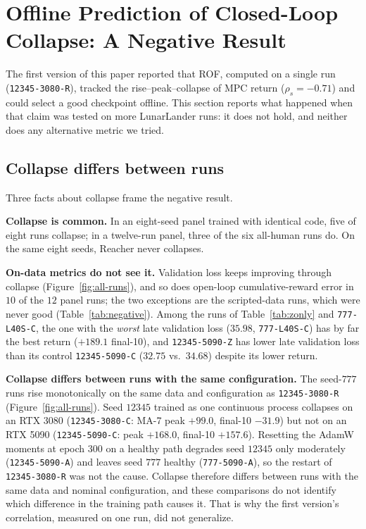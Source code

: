 \documentclass[11pt]{article}
\theoremstyle{remark}
\begin{document}
\section{Offline Prediction of Closed-Loop Collapse: A Negative Result}
\label{sec:negative}

The first version of this paper reported that ROF, computed on a single run (\texttt{12345-3080-R}), tracked the rise--peak--collapse of MPC return ($\rho_s{=}-0.71$) and could select a good checkpoint offline. This section reports what happened when that claim was tested on more LunarLander runs: it does not hold, and neither does any alternative metric we tried.

\subsection{Collapse differs between runs}
\label{sec:heterogeneity}

Three facts about collapse frame the negative result.

\textbf{Collapse is common.} In an eight-seed panel trained with identical code, five of eight runs collapse; in a twelve-run panel, three of the six all-human runs do. On the same eight seeds, Reacher never collapses.

\textbf{On-data metrics do not see it.} Validation loss keeps improving through collapse (Figure~\ref{fig:all-runs}), and so does open-loop cumulative-reward error in $10$ of the $12$ panel runs; the two exceptions are the scripted-data runs, which were never good (Table~\ref{tab:negative}). Among the runs of Table~\ref{tab:zonly} and \texttt{777-L40S-C}, the one with the \emph{worst} late validation loss ($35.98$, \texttt{777-L40S-C}) has by far the best return ($+189.1$ final-10), and \texttt{12345-5090-Z} has lower late validation loss than its control \texttt{12345-5090-C} ($32.75$ vs.\ $34.68$) despite its lower return.

\textbf{Collapse differs between runs with the same configuration.} The seed-$777$ runs rise monotonically on the same data and configuration as \texttt{12345-3080-R} (Figure~\ref{fig:all-runs}). Seed $12345$ trained as one continuous process collapses on an RTX 3080 (\texttt{12345-3080-C}: MA-7 peak $+99.0$, final-10 $-31.9$) but not on an RTX 5090 (\texttt{12345-5090-C}: peak $+168.0$, final-10 $+157.6$). Resetting the AdamW moments at epoch $300$ on a healthy path degrades seed $12345$ only moderately (\texttt{12345-5090-A}) and leaves seed $777$ healthy (\texttt{777-5090-A}), so the restart of \texttt{12345-3080-R} was not the cause. Collapse therefore differs between runs with the same data and nominal configuration, and these comparisons do not identify which difference in the training path causes it. That is why the first version's correlation, measured on one run, did not generalize.
\end{document}
